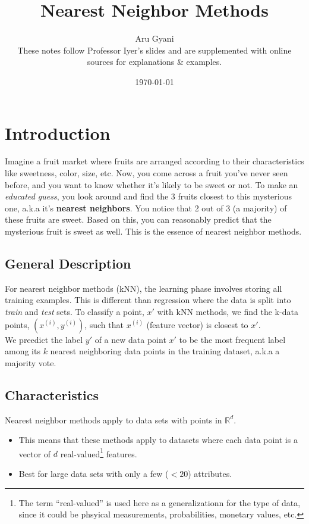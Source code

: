 \documentclass{report}
\title{Nearest Neighbor Methods}
\author{Aru Gyani\\\small{These notes follow Professor Iyer's slides and are
supplemented with online sources for explanations \& examples.}}
\date{\today}
\begin{document}
\addtolength{\skip\footins}{20pt}
\maketitle
\tableofcontents
\clearpage

\chapter{Introduction}

Imagine a fruit market where fruits are arranged according to their
characteristics like sweetness, color, size, etc.
Now, you come across a fruit you've never seen before, and you want to know whether it's likely to be sweet
or not. To make an \emph{educated guess}, you look around and find the 3 fruits
closest to this mysterious one, a.k.a it's \textbf{nearest neighbors}. You
notice that 2 out of 3 (a majority) of these fruits are sweet. Based on this, you can
reasonably predict that the mysterious fruit is sweet as well. This is the essence of nearest neighbor methods. 

\section{General Description}
For nearest neighbor methods (kNN), the learning phase involves storing all training
examples. This is different than regression where the data is split into
\emph{train} and \emph{test} sets. To classify a point, \(x'\) with kNN methods, we find
the k-data points, \((x^{(i)}, y^{(i)})\), such that \(x^{(i)}\) (feature
vector) is closest to \(x'\). 
\\[12pt]
We preedict the label \(y'\) of a new data point \(x'\) to be the most frequent
label among its \(k\) nearest neighboring data points in the training dataset,
a.k.a a majority vote.

\section{Characteristics}
Nearest neighbor methods apply to data sets with points in \(\mathds{R}^d\).
  \begin{itemize}
    \item This means that these methods apply to datasets where each
    data point is a vector of \(d\) real-valued\footnote{The term ``real-valued''
    is used here as a generalizationn for the type of data, since it could be
    phsyical measurements, probabilities, monetary values, etc.} features.
    \item Best for large data sets with only a few (\(< 20\)) attributes.
  \end{itemize}
\end{document}
